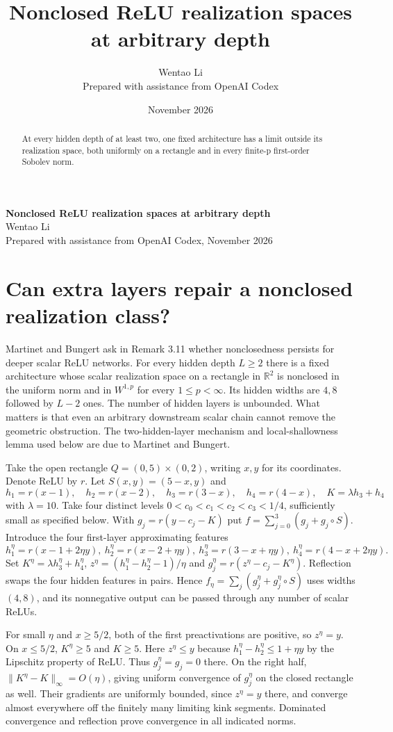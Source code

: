 \documentclass[10pt]{article}
\title{Nonclosed ReLU realization spaces at arbitrary depth}
\author{Wentao Li\\{\small Prepared with assistance from OpenAI Codex}}
\date{November 2026}
\begin{document}
\begin{center}{\Large\bfseries Nonclosed ReLU realization spaces at arbitrary depth}\\[3pt]Wentao Li\\{\small Prepared with assistance from OpenAI Codex, November 2026}\end{center}
\begin{abstract}
At every hidden depth of at least two, one fixed architecture has a limit outside its realization space, both uniformly on a rectangle and in every finite-p first-order Sobolev norm.
\end{abstract}
\section*{Can extra layers repair a nonclosed realization class?}
Martinet and Bungert ask in Remark 3.11 whether nonclosedness persists for deeper scalar ReLU networks. For every hidden depth $L\ge2$ there is a fixed architecture whose scalar realization space on a rectangle in $\mathbb R^2$ is nonclosed in the uniform norm and in $W^{1,p}$ for every $1\le p<\infty$. Its hidden widths are $4,8$ followed by $L-2$ ones. The number of hidden layers is unbounded. What matters is that even an arbitrary downstream scalar chain cannot remove the geometric obstruction. The two-hidden-layer mechanism and local-shallowness lemma used below are due to Martinet and Bungert.

Take the open rectangle $Q=(0,5)\times(0,2)$, writing $x,y$ for its coordinates. Denote ReLU by $r$. Let $S(x,y)=(5-x,y)$ and
\[
 h_1=r(x-1),\quad h_2=r(x-2),\quad h_3=r(3-x),\quad h_4=r(4-x),\quad K=\lambda h_3+h_4
\]
with $\lambda=10$. Take four distinct levels $0<c_0<c_1<c_2<c_3<1/4$, sufficiently small as specified below. With $g_j=r(y-c_j-K)$ put $f=\sum_{j=0}^3(g_j+g_j\circ S)$. Introduce the four first-layer approximating features
\[
 h_1^\eta=r(x-1+2\eta y),\ h_2^\eta=r(x-2+\eta y),\
 h_3^\eta=r(3-x+\eta y),\ h_4^\eta=r(4-x+2\eta y).
\]
Set $K^\eta=\lambda h_3^\eta+h_4^\eta$, $z^\eta=(h_1^\eta-h_2^\eta-1)/\eta$ and $g_j^\eta=r(z^\eta-c_j-K^\eta)$. Reflection swaps the four hidden features in pairs. Hence $f_\eta=\sum_j(g_j^\eta+g_j^\eta\circ S)$ uses widths $(4,8)$, and its nonnegative output can be passed through any number of scalar ReLUs.

For small $\eta$ and $x\ge5/2$, both of the first preactivations are positive, so $z^\eta=y$. On $x\le5/2$, $K^\eta\ge5$ and $K\ge5$. Here $z^\eta\le y$ because $h_1^\eta-h_2^\eta\le1+\eta y$ by the Lipschitz property of ReLU. Thus $g_j^\eta=g_j=0$ there. On the right half, $\|K^\eta-K\|_\infty=O(\eta)$, giving uniform convergence of $g_j^\eta$ on the closed rectangle as well. Their gradients are uniformly bounded, since $z^\eta=y$ there, and converge almost everywhere off the finitely many limiting kink segments. Dominated convergence and reflection prove convergence in all indicated norms.
\end{document}
